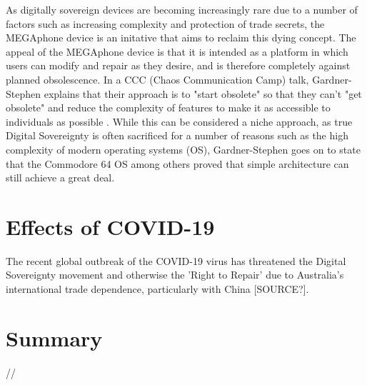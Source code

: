 As digitally sovereign devices are becoming increasingly rare due to a number of factors such as increasing complexity and protection of trade secrets, the MEGAphone device is an initative that aims to reclaim this dying concept. %
The appeal of the MEGAphone device is that it is intended as a platform in which users can modify and repair as they desire, and is therefore completely against planned obsolescence.
In a CCC (Chaos Communication Camp) talk, Gardner-Stephen explains that their approach is to "start obsolete" so that they can't "get obsolete" and reduce the complexity of features to make it as accessible to individuals as possible \cite{mobilehistory}.
While this can be considered a niche approach, as true Digital Sovereignty is often sacrificed for a number of reasons such as the high complexity of modern operating systems (OS), Gardner-Stephen goes on to state that the Commodore 64 OS among others proved that simple architecture can still achieve a great deal.


\section{Effects of COVID-19}
The recent global outbreak of the COVID-19 virus has threatened the Digital Sovereignty movement and otherwise the 'Right to Repair' due to Australia's international trade dependence, particularly with China [SOURCE?].


\section{Summary}
//


